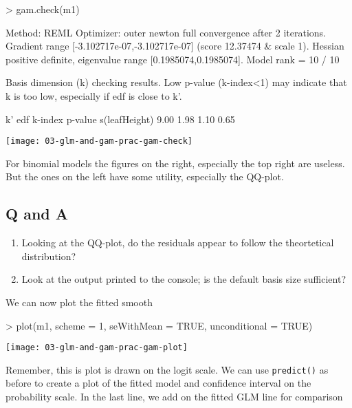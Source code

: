 \documentclass[a4paper,10pt]{article}
\begin{document}
\begin{Schunk}
\begin{Sinput}
> gam.check(m1)
\end{Sinput}
\begin{Soutput}
Method: REML   Optimizer: outer newton
full convergence after 2 iterations.
Gradient range [-3.102717e-07,-3.102717e-07]
(score 12.37474 & scale 1).
Hessian positive definite, eigenvalue range [0.1985074,0.1985074].
Model rank =  10 / 10 

Basis dimension (k) checking results. Low p-value (k-index<1) may
indicate that k is too low, especially if edf is close to k'.

                k'  edf k-index p-value
s(leafHeight) 9.00 1.98    1.10    0.65
\end{Soutput}
\end{Schunk}
\texttt{[image: 03-glm-and-gam-prac-gam-check]}

For binomial models the figures on the right, especially the top right are useless. But the ones on the left have some utility, especially the QQ-plot.

\subsection*{Q and A}
\begin{enumerate}
  \item Looking at the QQ-plot, do the residuals appear to follow the theortetical distribution?
  \item Look at the output printed to the console; is the default basis size sufficient?
\end{enumerate}

We can now plot the fitted smooth

\begin{Schunk}
\begin{Sinput}
> plot(m1, scheme = 1, seWithMean = TRUE, unconditional = TRUE)
\end{Sinput}
\end{Schunk}
\texttt{[image: 03-glm-and-gam-prac-gam-plot]}

Remember, this is plot is drawn on the logit scale. We can use \texttt{predict()} as before to create a plot of the fitted model and confidence interval on the probability scale. In the last line, we add on the fitted GLM line for comparison
\end{document}
